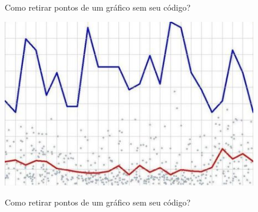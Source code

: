 \documentclass[
  ignorenonframetext,
]{beamer}
\newenvironment{Shaded}{\begin{snugshade}}{\end{snugshade}}
\newcommand{\DataTypeTok}[1]{\textcolor[rgb]{0.13,0.29,0.53}{#1}}
\newcommand{\KeywordTok}[1]{\textcolor[rgb]{0.13,0.29,0.53}{\textbf{#1}}}
\newcommand{\NormalTok}[1]{#1}
\newcommand{\OperatorTok}[1]{\textcolor[rgb]{0.81,0.36,0.00}{\textbf{#1}}}
\newcommand{\StringTok}[1]{\textcolor[rgb]{0.31,0.60,0.02}{#1}}
\begin{document}
\begin{frame}{Como retirar pontos de um gráfico sem seu código?}
\protect\hypertarget{como-retirar-pontos-de-um-gruxe1fico-sem-seu-cuxf3digo}{}

\includegraphics[width=4.4in]{IMAGENS/grafico_ponto}

\begin{center}
\tiny{}
\end{center}

\end{frame}

\begin{frame}[fragile]{Como retirar pontos de um gráfico sem seu
código?}
\protect\hypertarget{como-retirar-pontos-de-um-gruxe1fico-sem-seu-cuxf3digo-1}{}

\begin{Shaded}
\end{Shaded}

\end{frame}
\end{document}
